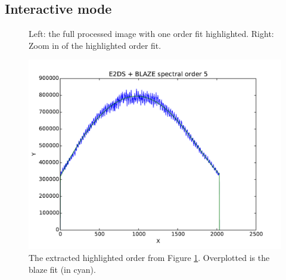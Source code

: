 \subsection{Interactive mode}

\begin{figure}
\begin{center}
\caption{Left: the full processed image with one order fit highlighted. Right: Zoom in of the highlighted order fit. \label{figure:cal_FF_RAW_spirou_1}}
\end{center}
\end{figure}

\begin{figure}
\begin{center}
\includegraphics[width=.8\textwidth]{figures/cal_FF_RAW_spirou_2.pdf}
\caption{The extracted highlighted order from Figure \protect\ref{figure:cal_FF_RAW_spirou_1}. Overplotted is the blaze fit (in cyan). \label{figure:cal_FF_RAW_spirou_2}}
\end{center}
\end{figure}

